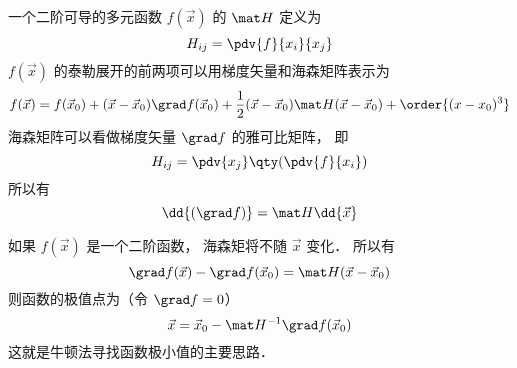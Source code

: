 
一个二阶可导的多元函数 $f(\vec x)$ 的 $\mat H$ 定义为
\begin{equation}
H_{ij} = \pdv{f}{x_i}{x_j}
\end{equation}
$f(\vec x)$ 的泰勒展开的前两项可以用梯度矢量和海森矩阵表示为
\begin{equation}
f(\vec x) = f(\vec x_0) + (\vec x - \vec x_0) \grad f(\vec x_0) + \frac12(\vec x - \vec x_0) \mat H (\vec x - \vec x_0) + \order{(x-x_0)^3}
\end{equation}
海森矩阵可以看做梯度矢量 $\grad f$ 的雅可比矩阵， 即
\begin{equation}
H_{ij} = \pdv{x_j} \qty(\pdv{f}{x_i})
\end{equation}
所以有
\begin{equation}
\dd{(\grad f)} = \mat H \dd{\vec x}
\end{equation}

如果 $f(\vec x)$ 是一个二阶函数， 海森矩将不随 $\vec x$ 变化． 所以有
\begin{equation}
\grad f(\vec x) - \grad f(\vec x_0) = \mat H (\vec x - \vec x_0)
\end{equation}
则函数的极值点为（令 $\grad f = 0$）
\begin{equation}
\vec x = \vec x_0 - \mat H^{-1} \grad f(\vec x_0)
\end{equation}
这就是牛顿法寻找函数极小值的主要思路．
